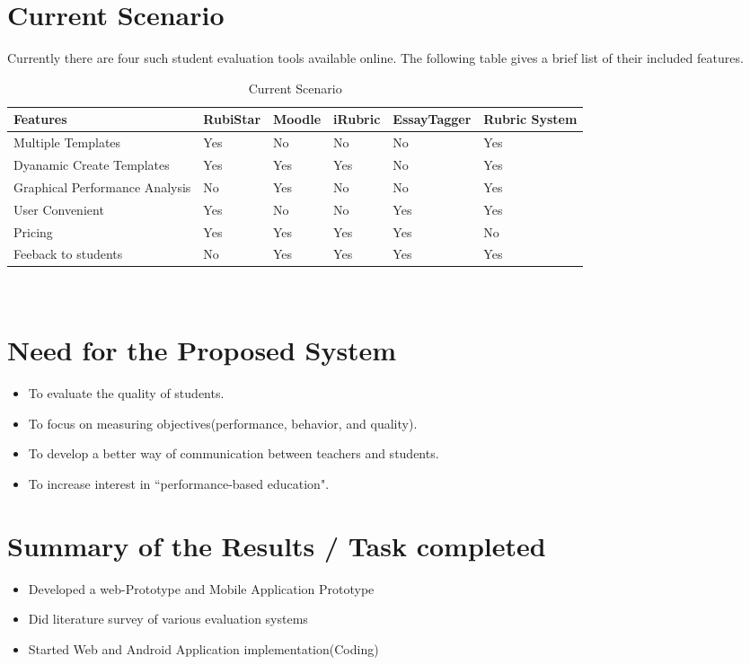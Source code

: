 \section{Current Scenario}
Currently there are four such student evaluation tools available online. The following table gives a brief list of their included features.
\begin {table}[H]
\begin{center}
\begin{tabular}{ | m{3.5cm} | m{2cm}| m{2cm}| m{2cm} |m{2.6cm}| m{2cm} | }
\hline
\textbf{Features} & \textbf{RubiStar} & \textbf{Moodle} & \textbf{iRubric} & \textbf{EssayTagger} & \textbf{Rubric System}\\ 
\hline
Multiple Templates & Yes & No & No & No & Yes\\
\hline
Dyanamic Create Templates & Yes & Yes & Yes & No & Yes\\
\hline
Graphical Performance Analysis & No & Yes & No & No & Yes\\
\hline
User Convenient & Yes & No & No & Yes & Yes\\
\hline
Pricing & Yes & Yes & Yes & Yes & No\\
\hline
Feeback to students & No & Yes & Yes & Yes & Yes\\
\hline
\end{tabular}\\
\caption {Current Scenario}
\end{center}
\end {table}


\section{Need for the Proposed System}
\begin{itemize}
\item To evaluate the quality of students.
\item To focus on measuring objectives(performance, behavior, and quality).
\item To develop a better way of communication between teachers and students.
\item To increase interest in ``performance-based education".
\end{itemize}
\section{Summary of the Results / Task completed }
\begin{itemize}
\item Developed a web-Prototype and Mobile Application Prototype
\item Did literature survey of various evaluation systems
\item Started Web and Android Application implementation(Coding)
\end{itemize}
\newpage


